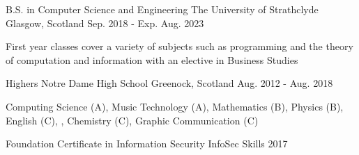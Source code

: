 

\begin{cventries}

  \cventry
    {B.S. in Computer Science and Engineering} %
    {The University of Strathclyde} %
    {Glasgow, Scotland} %
    {Sep. 2018 - Exp. Aug. 2023} %
    {
      \begin{cvitems} %
        \item {First year classes cover a variety of subjects such as programming and the theory of computation and information with an elective in Business Studies}
      \end{cvitems}
    }

  \cventry
    {Highers} %
    {Notre Dame High School} %
    {Greenock, Scotland} %
    {Aug. 2012 - Aug. 2018} %
    {
      \begin{cvitems} %
        \item {Computing Science (A), Music Technology (A), Mathematics (B), Physics (B), English (C), , Chemistry (C), Graphic Communication (C)}
      \end{cvitems}
    }
  \cventry
    {Foundation Certificate in Information Security} %
    {InfoSec Skills} %
    {} %
    {2017} %
    {
    }
\end{cventries}
